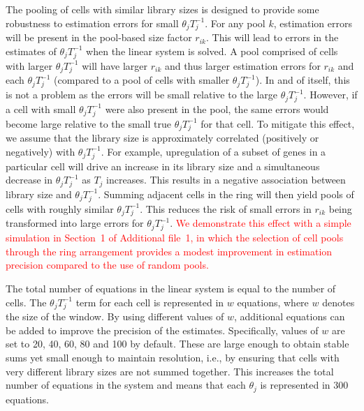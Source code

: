 \documentclass{bmcart}
\newcommand{\supppoolsim}{1}
\newcommand{\revised}[1]{\textcolor{red}{#1}}
\begin{document}
The pooling of cells with similar library sizes is designed to provide some robustness to estimation errors for small $\theta_j T_j^{-1}$.
For any pool $k$, estimation errors will be present in the pool-based size factor $r_{ik}$.
This will lead to errors in the estimates of $\theta_j T_j^{-1}$ when the linear system is solved.
A pool comprised of cells with larger $\theta_j T_j^{-1}$ will have larger $r_{ik}$ and thus larger estimation errors for $r_{ik}$ and each $\theta_j T_j^{-1}$ (compared to a pool of cells with smaller $\theta_j T_j^{-1}$).
In and of itself, this is not a problem as the errors will be small relative to the large $\theta_j T_j^{-1}$.
However, if a cell with small $\theta_j T_j^{-1}$ were also present in the pool, the same errors would become large relative to the small true $\theta_j T_j^{-1}$ for that cell.
To mitigate this effect, we assume that the library size is approximately correlated (positively or negatively) with $\theta_j T_j^{-1}$.
For example, upregulation of a subset of genes in a particular cell will drive an increase in its library size and a simultaneous decrease in $\theta_j T_j^{-1}$ as $T_j$ increases.
This results in a negative association between library size and $\theta_j T_j^{-1}$.
Summing adjacent cells in the ring will then yield pools of cells with roughly similar $\theta_j T_j^{-1}$.
This reduces the risk of small errors in $r_{ik}$ being transformed into large errors for $\theta_j T_j^{-1}$.
\revised{We demonstrate this effect with a simple simulation in Section~\supppoolsim{} of Additional file~1, in which the selection of cell pools through the ring arrangement provides a modest improvement in estimation precision compared to the use of random pools.}

The total number of equations in the linear system is equal to the number of cells.
The $\theta_jT_j^{-1}$ term for each cell is represented in $w$ equations, where $w$ denotes the size of the window.
By using different values of $w$, additional equations can be added to improve the precision of the estimates. 
Specifically, values of $w$ are set to 20, 40, 60, 80 and 100 by default.
These are large enough to obtain stable sums yet small enough to maintain resolution, i.e., by ensuring that cells with very different library sizes are not summed together.
This increases the total number of equations in the system and means that each $\theta_j$ is represented in 300 equations. 
\end{document}
